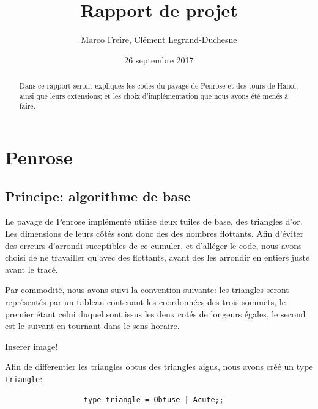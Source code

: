 \documentclass[a4paper, 11pt]{article}%
\begin{document}
\title{Rapport de projet}

\author{Marco Freire, Clément Legrand-Duchesne}

\date{26 septembre 2017}

\maketitle

\begin{abstract}
  Dans ce rapport seront expliqués les codes du pavage de Penrose et des
  tours de Hanoi, ainsi que leurs extensions; et les choix d'implémentation
  que nous avons été menés à faire.
\end{abstract}


\section{Penrose}

        \subsection{Principe: algorithme de base}
                Le pavage de Penrose implémenté utilise deux tuiles de
                base, des triangles d'or. Les dimensions de leurs
                côtés sont donc des des nombres flottants. Afin
                d'éviter des erreurs d'arrondi suceptibles de ce
                cumuler, et d'alléger le code, nous avons choisi de ne
                travailler qu'avec des flottants, avant des les
                arrondir en entiers juste avant le tracé.
                
                Par commodité, nous avons suivi la convention
                suivante: les triangles seront représentés par un
                tableau contenant les coordonnées des trois sommets,
                le premier étant celui duquel sont issus les deux
                cotés de longeurs égales, le second est le suivant en
                tournant dans le sens horaire.

                Inserer image!

                Afin de differentier les triangles obtus des triangles
                aigus, nous avons créé un type \texttt{triangle}:

		\begin{lstlisting}
                  type triangle = Obtuse | Acute;;
		\end{lstlisting}
\end{document}
